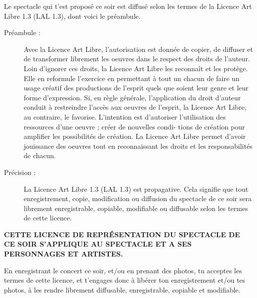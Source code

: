 Le spectacle qui t'est propos\'e ce soir est diffus\'e selon les termes de la Licence Art Libre 1.3 (LAL 1.3), dont voici le
pr\'eambule.

\begin{description}
    \item[Pr\'eambule :] Avec la Licence Art Libre, l'autorisation est donn\'ee de copier, de diffuser et de transformer librement les oeuvres dans le
respect des droits de l'auteur.
Loin d'ignorer ces droits, la Licence Art Libre les reconna\^it et les prot\`ege. Elle en reformule l'exercice en permettant \`a
tout un chacun de faire un usage cr\'eatif des productions de l'esprit quels que soient leur genre et leur forme d'expression.
Si, en r\`egle g\'en\'erale, l'application du droit d'auteur conduit \`a restreindre l'acc\`es aux oeuvres de l'esprit, la Licence Art
Libre, au contraire, le favorise. L'intention est d'autoriser l'utilisation des ressources d'une oeuvre ; cr\'eer de nouvelles condi-
tions de cr\'eation pour amplifier les possibilit\'es de cr\'eation. La Licence Art Libre permet d'avoir jouissance des oeuvres tout
en reconnaissant les droits et les responsabilit\'es de chacun.

    \item[Pr\'ecision :] La Licence Art Libre 1.3 (LAL 1.3) est propagative. Cela signifie que tout enregistrement, copie, modification ou diffusion
du spectacle de ce soir sera librement enregistrable, copiable, modifiable ou diffusable selon les termes de cette licence.

\end{description}

\begin{center}
\textbf{CETTE LICENCE DE REPR\'ESENTATION DU SPECTACLE DE CE SOIR S'APPLIQUE AU
SPECTACLE ET A SES PERSONNAGES ET ARTISTES.}
\end{center}

En enregistrant le concert ce soir, et/ou en prenant des photos, tu acceptes les termes de cette licence, et t'engages donc
\`a lib\'erer ton enregistrement et/ou tes photos, \`a les rendre librement diffusable, enregistrable, copiable et modifiable.
